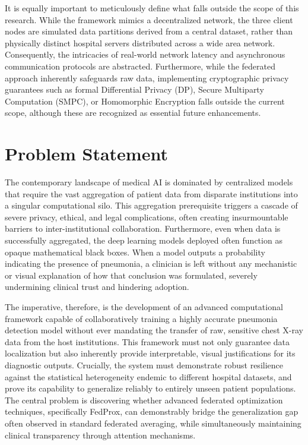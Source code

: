 \documentclass[12pt,a4paper]{report}
\begin{document}
It is equally important to meticulously define what falls outside the scope of this research. While the framework mimics a decentralized network, the three client nodes are simulated data partitions derived from a central dataset, rather than physically distinct hospital servers distributed across a wide area network. Consequently, the intricacies of real-world network latency and asynchronous communication protocols are abstracted. Furthermore, while the federated approach inherently safeguards raw data, implementing cryptographic privacy guarantees such as formal Differential Privacy (DP), Secure Multiparty Computation (SMPC), or Homomorphic Encryption falls outside the current scope, although these are recognized as essential future enhancements.

\section{Problem Statement}

The contemporary landscape of medical AI is dominated by centralized models that require the vast aggregation of patient data from disparate institutions into a singular computational silo. This aggregation prerequisite triggers a cascade of severe privacy, ethical, and legal complications, often creating insurmountable barriers to inter-institutional collaboration. Furthermore, even when data is successfully aggregated, the deep learning models deployed often function as opaque mathematical black boxes. When a model outputs a probability indicating the presence of pneumonia, a clinician is left without any mechanistic or visual explanation of how that conclusion was formulated, severely undermining clinical trust and hindering adoption.

The imperative, therefore, is the development of an advanced computational framework capable of collaboratively training a highly accurate pneumonia detection model without ever mandating the transfer of raw, sensitive chest X-ray data from the host institutions. This framework must not only guarantee data localization but also inherently provide interpretable, visual justifications for its diagnostic outputs. Crucially, the system must demonstrate robust resilience against the statistical heterogeneity endemic to different hospital datasets, and prove its capability to generalize reliably to entirely unseen patient populations. The central problem is discovering whether advanced federated optimization techniques, specifically FedProx, can demonstrably bridge the generalization gap often observed in standard federated averaging, while simultaneously maintaining clinical transparency through attention mechanisms.
\end{document}
